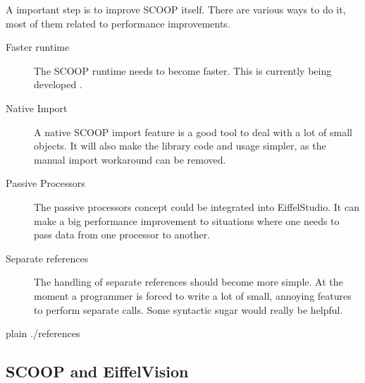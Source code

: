 \documentclass[a4paper,10pt]{article}
\begin{document}
A important step is to improve SCOOP itself.
There are various ways to do it, most of them related to performance improvements.

\begin{description}
 \item [Faster runtime] The SCOOP runtime needs to become faster. 
 This is currently being developed \cite{thesis:scottwest}.
 \item [Native Import] A native SCOOP import feature is a good tool to deal with a lot of small objects.
 It will also make the library code and usage simpler, as the manual import workaround can be removed.
 \item [Passive Processors] The passive processors concept \cite{paper:passive-processors} could be integrated into EiffelStudio.
 It can make a big performance improvement to situations where one needs to pass data from one processor to another.
 \item [Separate references] The handling of separate references should become more simple.
 At the moment a programmer is forced to write a lot of small, annoying features to perform separate calls.
 Some syntactic sugar would really be helpful.
\end{description}


\begin{flushleft}
{{{
 {plain}
 {./references}
}}}
\end{flushleft}


\begin{appendices}
% 

\section{SCOOP and EiffelVision}
\end{appendices}

\todos
\end{document}
